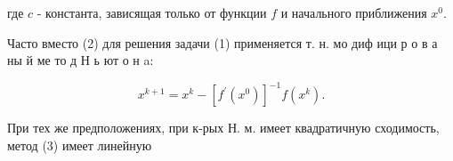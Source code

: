 \documentclass[10pt]{article}
\begin{document}
где $c$ - константа, зависящая только от функции $f$ и начального приближения $x^{0}$.



Часто вместо (2) для решения задачи (1) применяется т. н. мо диф ици р о в а ны й ме то д Н ь ют о н a:



\[

x^{k+1}=x^{k}-\left[f^{\prime}\left(x^{0}\right)\right]^{-1} f\left(x^{k}\right) .

\]



При тех же предположениях, при к-рых Н. м. имеет квадратичную сходимость, метод (3) имеет линейную
\end{document}
